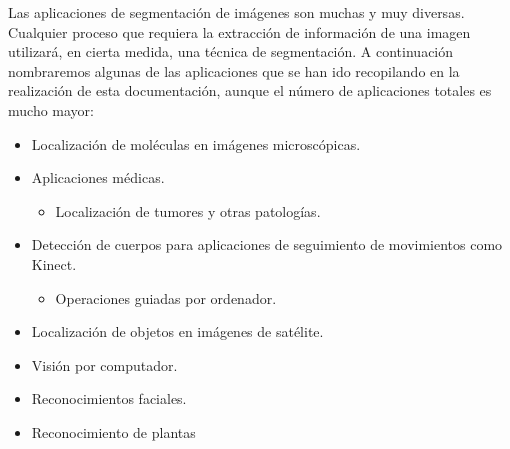 Las aplicaciones de segmentaci\'{o}n de im\'{a}genes son muchas y muy diversas. Cualquier proceso que requiera la extracci\'{o}n de informaci\'{o}n de una imagen utilizar\'{a}, en cierta medida, una t\'{e}cnica de segmentaci\'{o}n. A continuaci\'{o}n nombraremos algunas de las aplicaciones que se han ido recopilando en la realizaci\'{o}n de esta documentaci\'{o}n, aunque el n\'{u}mero de aplicaciones totales es mucho mayor:

\begin{itemize}
	\item Localizaci\'{o}n de mol\'{e}culas en im\'{a}genes microsc\'{o}picas.
	\item Aplicaciones m\'{e}dicas.
			\begin{itemize}
				\item Localizaci\'{o}n de tumores y otras patolog\'{i}as.
			\end{itemize}
	\item Detecci\'{o}n de cuerpos para aplicaciones de seguimiento de movimientos como Kinect.
		\begin{itemize}
			\item Operaciones guiadas por ordenador.
		\end{itemize}
	\item Localizaci\'{o}n de objetos en im\'{a}genes de sat\'{e}lite.
	\item Visi\'{o}n por computador.
	\item Reconocimientos faciales.
	\item Reconocimiento de plantas
\end{itemize}
